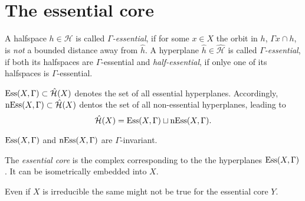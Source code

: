 \section{The essential core}
\label{sec:essential}

\begin{defin}
  A halfspace \(h \in \mathcal{H}\) is called \emph{\(\Gamma\)-essential}, if for some \(x \in X\) the orbit in \(h\), \(\Gamma x \cap h\), is \emph{not} a bounded distance away from \(\hat h\). A hyperplane \(\hat h \in \mathcal{\hat H}\) is called \emph{\(\Gamma\)-essential}, if both its halfspaces are \(\Gamma\)-essential and \emph{half-essential}, if onlye one of its halfspaces is \(\Gamma\)-essential.

  \(\operatorname{Ess}(X,\Gamma)\subset \mathcal{\hat H}(X)\) denotes the set of all essential hyperplanes. Accordingly, \(\operatorname{nEss}(X,\Gamma) \subset \mathcal{\hat H}(X)\) dentos the set of all non-essential hyperplanes, leading to
  \[
    \mathcal{\hat H}(X) = \operatorname{Ess}(X, \Gamma) \sqcup \operatorname{nEss}(X, \Gamma).
  \]
\end{defin}

\begin{prop}
  \(\operatorname{Ess}(X, \Gamma)\) and \(\operatorname{nEss}(X, \Gamma)\) are \(\Gamma\)-invariant.
\end{prop}

\begin{defin}
  The \emph{essential core} is the complex corresponding to the the hyperplanes \(\operatorname{Ess}(X, \Gamma)\). It can be isometrically embedded into \(X\).
\end{defin}


\begin{rem}
  Even if \(X\) is irreducible the same might not be true for the essential core \(Y\). 
\end{rem}

